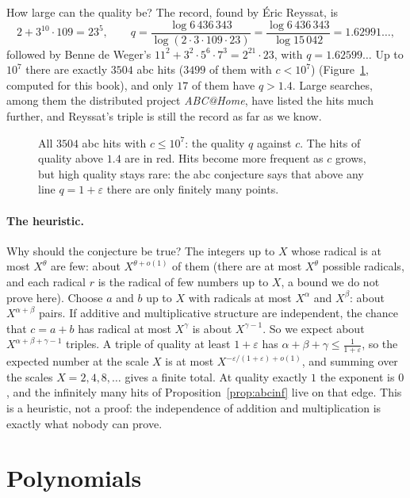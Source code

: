How large can the quality be? The record, found by \'Eric Reyssat, is
\[
2+3^{10}\cdot109=23^5,\qquad q=\frac{\log 6\,436\,343}{\log(2\cdot3\cdot109\cdot23)}=\frac{\log6\,436\,343}{\log15\,042}=1.62991\ldots,
\]
followed by Benne de Weger's $11^2+3^2\cdot5^6\cdot7^3=2^{21}\cdot23$, with $q=1.62599\ldots$ Up to $10^7$ there are exactly $3504$ abc hits ($3499$ of them with $c<10^7$)
(Figure~\ref{fig:abcquality}, computed for this book), and only $17$ of them have $q>1.4$. Large searches, among them the distributed project
\emph{ABC@Home}, have listed the hits much further, and Reyssat's triple is still the record as far as we know.

\begin{figure}[ht]
\centering
{}
\caption{All $3504$ abc hits with $c\le10^7$: the quality $q$ against $c$. The hits of quality above $1.4$ are in red. Hits become more frequent as $c$
grows, but high quality stays rare: the abc conjecture says that above any line $q=1+\varepsilon$ there are only finitely many points.}
\label{fig:abcquality}
\end{figure}

\paragraph{The heuristic.} Why should the conjecture be true? The integers up to $X$ whose radical is at most $X^\theta$ are few: about $X^{\theta+o(1)}$
of them (there are at most $X^\theta$ possible radicals, and each radical $r$ is the radical of few numbers up to $X$, a bound we do not prove here).
Choose $a$ and $b$ up to $X$ with radicals at most $X^\alpha$ and $X^\beta$: about $X^{\alpha+\beta}$ pairs. If additive and multiplicative structure
are independent, the chance that $c=a+b$ has radical at most $X^\gamma$ is about $X^{\gamma-1}$. So we expect about $X^{\alpha+\beta+\gamma-1}$ triples.
A triple of quality at least $1+\varepsilon$ has $\alpha+\beta+\gamma\le\frac1{1+\varepsilon}$, so the expected number at the scale $X$ is at most
$X^{-\varepsilon/(1+\varepsilon)+o(1)}$, and summing over the scales $X=2,4,8,\dots$ gives a finite total. At quality exactly $1$ the exponent is $0$,
and the infinitely many hits of Proposition~\ref{prop:abcinf} live on that edge. This is a heuristic, not a proof: the independence of addition and
multiplication is exactly what nobody can prove.

\section{Polynomials}

